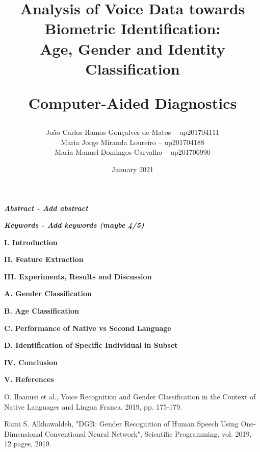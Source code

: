 \documentclass{article}
\title{\textbf{Analysis of Voice Data towards Biometric Identification:\\ Age, Gender and Identity Classification}\par Computer-Aided Diagnostics}
\author{
João Carlos Ramos Gonçalves de Matos – up201704111\\
Maria Jorge Miranda Loureiro – up201704188\\
Maria Manuel Domingos Carvalho – up201706990\\
}
\date{\nth{15} January 2021}
\begin{document}
\maketitle
\thispagestyle{empty} 

\justify
\normalsize
\setlength{\parindent}{0pt}

\textbf{\emph{Abstract - Add abstract} }
\vspace{2mm}

\textbf{\emph{Keywords - Add keywords (maybe 4/5) } }
\vspace{2mm}

\textbf{I. Introduction}\par

\vspace{2mm}
\textbf{II. Feature Extraction }\par


\vspace{2mm}
\textbf{III. Experiments, Results and Discussion }\par

\vspace{2mm}
\textbf{ A. Gender Classification }\par

\vspace{2mm}
\textbf{ B. Age Classification }\par

\vspace{2mm}
\textbf{ C. Performance of Native vs Second Language }\par

\vspace{2mm}
\textbf{ D. Identification of Specific Individual in Subset }\par

\vspace{2mm}
\textbf{IV. Conclusion }\par


\vspace{2mm}
\textbf{V. References}\par
[1]	O. Iloanusi et al., Voice Recognition and Gender Classification in the Context of Native Languages and Lingua Franca. 2019, pp. 175-179.\par
[2] Rami S. Alkhawaldeh, "DGR: Gender Recognition of Human Speech Using One-Dimensional Conventional Neural Network", Scientific Programming, vol. 2019, 12 pages, 2019.
\end{document}
